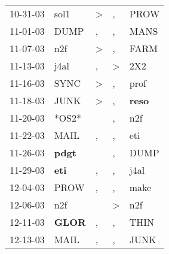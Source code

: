 \begin{supertabular}{p{0.07\textwidth}p{0.06\textwidth}p{0.02\textwidth}p{0.02\textwidth}p{0.06\textwidth}}
          10-31-03\textsuperscript{} &           sol1\textsuperscript{} &     \textgreater &                , &           PROW\textsuperscript{} \\
          11-01-03\textsuperscript{} &           DUMP\textsuperscript{} &                , &                , &           MANS\textsuperscript{} \\
          11-07-03\textsuperscript{} &            n2f\textsuperscript{} &     \textgreater &                , &           FARM\textsuperscript{} \\
          11-13-03\textsuperscript{} &           j4al\textsuperscript{} &                , &     \textgreater &            2X2\textsuperscript{} \\
          11-16-03\textsuperscript{} &           SYNC\textsuperscript{} &     \textgreater &                , &           prof\textsuperscript{} \\
          11-18-03\textsuperscript{} &           JUNK\textsuperscript{} &     \textgreater &                , &  \textbf{reso\textsuperscript{}} \\
          11-20-03\textsuperscript{} &                            *OS2* &                  &                , &            n2f\textsuperscript{} \\
          11-22-03\textsuperscript{} &           MAIL\textsuperscript{} &                , &                , &            eti\textsuperscript{} \\
          11-26-03\textsuperscript{} &  \textbf{pdgt\textsuperscript{}} &                  &                , &           DUMP\textsuperscript{} \\
          11-29-03\textsuperscript{} &   \textbf{eti\textsuperscript{}} &                , &                , &           j4al\textsuperscript{} \\
          12-04-03\textsuperscript{} &           PROW\textsuperscript{} &                , &                , &           make\textsuperscript{} \\
          12-06-03\textsuperscript{} &            n2f\textsuperscript{} &                  &     \textgreater &            n2f\textsuperscript{} \\
          12-11-03\textsuperscript{} &  \textbf{GLOR\textsuperscript{}} &                , &                , &           THIN\textsuperscript{} \\
          12-13-03\textsuperscript{} &           MAIL\textsuperscript{} &                , &                , &           JUNK\textsuperscript{} \\

\end{supertabular}
